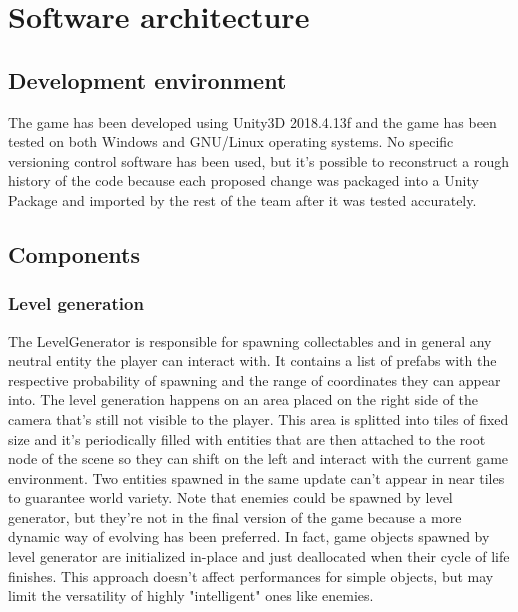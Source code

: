 \documentclass[11pt]{article}
\begin{document}
\section{Software architecture}
\subsection{Development environment}
The game has been developed using Unity3D 2018.4.13f and the game has been tested on both Windows and GNU/Linux operating systems. No specific versioning control software has been used, but it's possible to reconstruct a rough history of the code because each proposed change was packaged into a Unity Package and imported by the rest of the team after it was tested accurately.

\subsection{Components}
\subsubsection{Level generation}
The LevelGenerator is responsible for spawning collectables and in general any neutral entity the player can interact with.
It contains a list of prefabs with the respective probability of spawning and the range of coordinates they can appear into.
The level generation happens on an area placed on the right side of the camera that's still not visible to the player.
This area is splitted into tiles of fixed size and it's periodically filled with entities that are then attached to the root node of the scene so they can shift on the left and interact with the current game environment. Two entities spawned in the same update can't appear in near tiles to guarantee world variety.
Note that enemies could be spawned by level generator, but they're not in the final version of the game because a more dynamic way of evolving has been preferred. In fact, game objects spawned by level generator are initialized in-place and just deallocated when their cycle of life finishes. This approach doesn't affect performances for simple objects, but may limit the versatility of highly "intelligent" ones like enemies.
\end{document}
